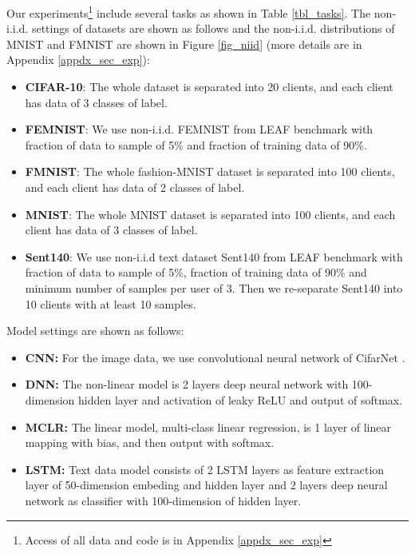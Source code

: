 \documentclass{article}
\begin{document}
Our experiments\footnote{Access of all data and code is in Appendix \ref{appdx_sec_exp}} include several tasks as shown in Table \ref{tbl_tasks}. The non-i.i.d. settings of datasets are shown as follows and the non-i.i.d. distributions of MNIST and FMNIST are shown in Figure \ref{fig_niid} (more details are in Appendix \ref{appdx_sec_exp}):
\begin{itemize}
    \item \textbf{CIFAR-10}: The whole dataset is separated into 20 clients, and each client has data of 3 classes of label.\cite{dinh2021fedu, krizhevsky2009learning}
    \item \textbf{FEMNIST}: We use non-i.i.d. FEMNIST from LEAF benchmark with fraction of data to sample of 5\% and fraction of training data of 90\%.\cite{caldas2018leaf}
    \item \textbf{FMNIST}: The whole fashion-MNIST dataset is separated into 100 clients, and each client has data of 2 classes of label.\cite{t2020personalized, xiao2017fashion}
    \item \textbf{MNIST}: The whole MNIST dataset is separated into 100 clients, and each client has data of 3 classes of label.\cite{t2020personalized, lecun1998gradient}
    \item \textbf{Sent140}: We use non-i.i.d text dataset Sent140 from LEAF benchmark with fraction of data to sample of 5\%, fraction of training data of 90\% and minimum number of samples per user of 3. Then we re-separate Sent140 into 10 clients with at least 10 samples.\cite{caldas2018leaf}
\end{itemize}
Model settings are shown as follows:
\begin{itemize}
    \item \textbf{CNN:} For the image data, we use convolutional neural network of CifarNet \cite{hosang2015taking}.
    \item \textbf{DNN:} The non-linear model is 2 layers deep neural network with 100-dimension hidden layer and activation of leaky ReLU \cite{maas2013rectifier} and output of softmax.
    \item \textbf{MCLR:} The linear model, multi-class linear regression, is 1 layer of linear mapping with bias, and then output with softmax.
    \item \textbf{LSTM:} Text data model consists of 2 LSTM layers \cite{hochreiter1997long} as feature extraction layer of 50-dimension embeding and hidden layer and 2 layers deep neural network as classifier with 100-dimension of hidden layer.
\end{itemize}
\end{document}
